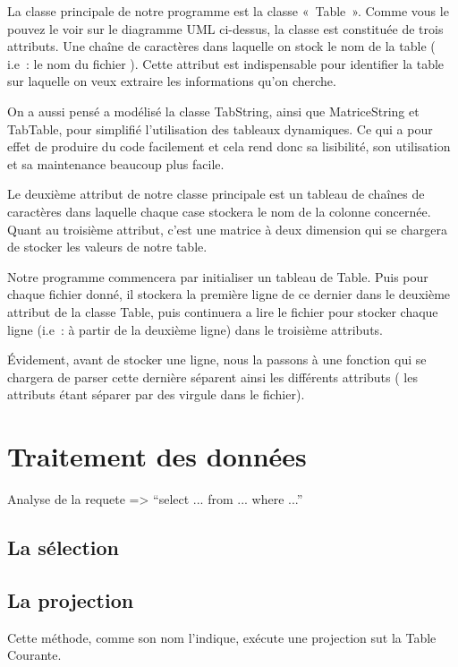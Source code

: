 \documentclass[oneside,13pt,a4paper]{report}
\begin{document}
            La classe principale de notre programme est la classe « Table ». Comme vous le pouvez le voir sur le diagramme UML ci-dessus, la classe est constituée de trois attributs. Une chaîne de caractères dans laquelle on stock le nom de la table ( i.e : le nom du fichier ). Cette attribut est indispensable pour identifier la table sur laquelle on veux extraire les informations qu’on cherche.

            On a aussi pensé a modélisé la classe TabString, ainsi que MatriceString et TabTable, pour simplifié l’utilisation des tableaux dynamiques. Ce qui a pour effet de produire du code facilement et cela rend donc sa lisibilité, son utilisation et sa maintenance beaucoup plus facile.

            Le deuxième attribut de notre classe principale est un tableau de chaînes de caractères dans laquelle chaque case stockera le nom de la colonne concernée. Quant au troisième attribut, c’est une matrice à deux dimension qui se chargera de stocker les valeurs de notre table.
            
            Notre programme commencera par initialiser un tableau de Table. Puis pour chaque fichier donné, il stockera la première ligne de ce dernier dans le deuxième attribut de la classe Table, puis continuera a lire le fichier pour stocker chaque ligne (i.e : à partir de la deuxième ligne) dans le troisième attributs.

            Évidement, avant de stocker une ligne, nous la passons à une fonction qui se chargera de parser cette dernière séparent ainsi les différents attributs ( les attributs étant séparer par des virgule dans le fichier).

        \section{Traitement des données}

            Analyse de la requete => \enquote{select ... from ... where ...}

            \subsection{La sélection}

            \subsection{La projection}

                Cette méthode, comme son nom l'indique, exécute une projection sut la Table Courante.
\end{document}
